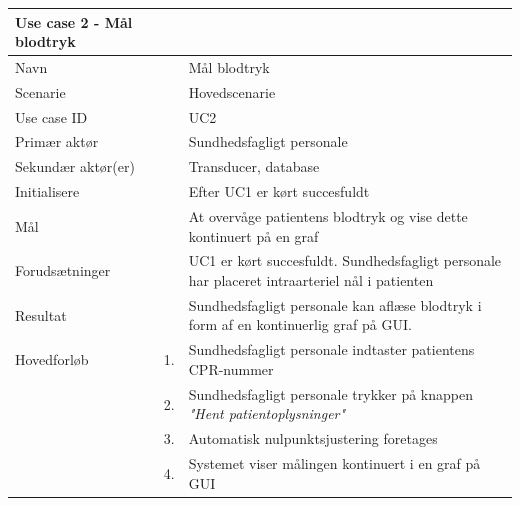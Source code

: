 \begin{longtabu} to 
\toprule
    {\large \textbf{Use case 2 - Mål blodtryk}} && \\
    \toprule
    Navn &&    Mål blodtryk\\
    Scenarie &&    Hovedscenarie\\
    Use case ID &&    UC2\\
    Primær aktør &&    Sundhedsfagligt personale\\
    Sekundær aktør(er) &&    Transducer, database\\
    Initialisere &&    Efter UC1 er kørt succesfuldt\\
    Mål &&    At overvåge patientens blodtryk og vise dette kontinuert på en graf\\
    Forudsætninger &&    UC1 er kørt succesfuldt. Sundhedsfagligt personale har placeret intraarteriel nål i patienten\\
    Resultat &&    Sundhedsfagligt personale kan aflæse blodtryk i form af en kontinuerlig graf på GUI.\\
    \toprule
    Hovedforløb &    1. &    Sundhedsfagligt personale indtaster patientens CPR-nummer\\[-1ex]
    			&    2. &    Sundhedsfagligt personale trykker på knappen \textit{"Hent patientoplysninger"}\\[-1ex]
    			&	3.	&	Automatisk nulpunktsjustering foretages\\[-1ex]
                &    4. &    Systemet viser målingen kontinuert i en graf på GUI\\

\end{longtabu}
